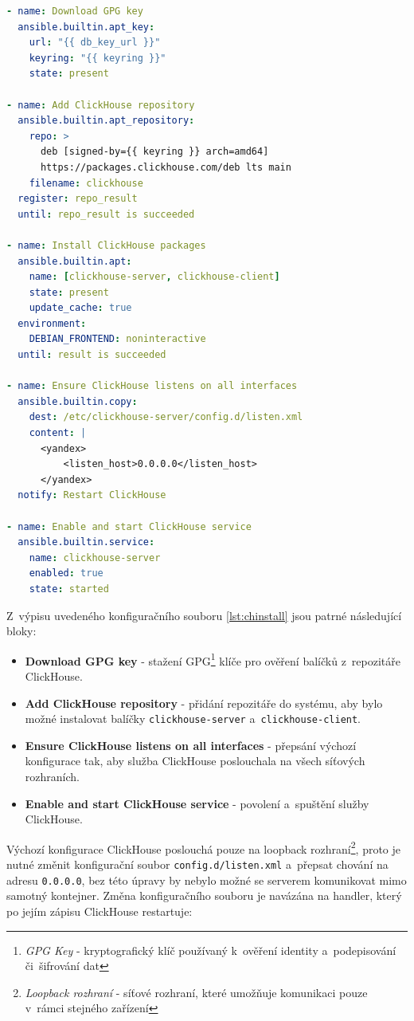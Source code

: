 \begin{lstlisting}[language=YAML, caption={roles/clickhousedb/tasks/install.yml (zkráceno)}, label={lst:chinstall}, captionpos=b]
- name: Download GPG key
  ansible.builtin.apt_key:
    url: "{{ db_key_url }}"
    keyring: "{{ keyring }}"
    state: present

- name: Add ClickHouse repository
  ansible.builtin.apt_repository:
    repo: >
      deb [signed-by={{ keyring }} arch=amd64]
      https://packages.clickhouse.com/deb lts main
    filename: clickhouse
  register: repo_result
  until: repo_result is succeeded

- name: Install ClickHouse packages
  ansible.builtin.apt:
    name: [clickhouse-server, clickhouse-client]
    state: present
    update_cache: true
  environment:
    DEBIAN_FRONTEND: noninteractive
  until: result is succeeded

- name: Ensure ClickHouse listens on all interfaces
  ansible.builtin.copy:
    dest: /etc/clickhouse-server/config.d/listen.xml
    content: |
      <yandex>
          <listen_host>0.0.0.0</listen_host>
      </yandex>
  notify: Restart ClickHouse

- name: Enable and start ClickHouse service
  ansible.builtin.service:
    name: clickhouse-server
    enabled: true
    state: started
\end{lstlisting}

Z~výpisu uvedeného konfiguračního souboru \ref{lst:chinstall} jsou patrné následující bloky:

\begin{itemize}
  \item \textbf{Download GPG key} - stažení GPG\footnote{\textit{GPG Key} - kryptografický klíč používaný k~ověření identity a~podepisování či~šifrování dat} klíče pro ověření balíčků z~repozitáře ClickHouse.
  \item \textbf{Add ClickHouse repository} - přidání repozitáře do systému, aby bylo možné instalovat balíčky \texttt{clickhouse-server} a~\texttt{clickhouse-client}.
  \item \textbf{Ensure ClickHouse listens on all interfaces} - přepsání výchozí konfigurace tak, aby služba ClickHouse poslouchala na všech síťových rozhraních.
  \item \textbf{Enable and start ClickHouse service} - povolení a~spuštění služby ClickHouse.
\end{itemize}

Výchozí konfigurace ClickHouse poslouchá pouze na loopback rozhraní\footnote{\textit{Loopback rozhraní} - síťové rozhraní, které umožňuje komunikaci pouze v~rámci stejného zařízení}, proto je nutné změnit konfigurační soubor \texttt{config.d/listen.xml} a~přepsat chování na adresu \texttt{0.0.0.0}, bez této úpravy by nebylo možné se serverem komunikovat mimo samotný kontejner. 
Změna konfiguračního souboru je navázána na handler, který po jejím zápisu ClickHouse restartuje:

